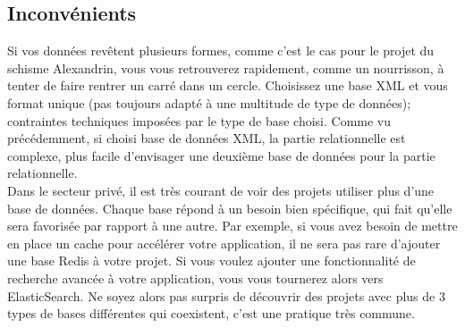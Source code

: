     \subsection{Inconvénients}

Si vos données revêtent plusieurs formes, comme c’est le cas pour le projet du schisme Alexandrin, vous vous retrouverez rapidement, comme un nourrisson, à tenter de faire rentrer un carré dans un cercle. Choisissez une base XML et vous 
format unique (pas toujours adapté à une multitude de type de données); contraintes techniques imposées par le type de base choisi. Comme vu précédemment, si choisi base de données XML, la partie relationnelle est complexe, plus facile d’envisager une deuxième base de données pour la partie relationnelle.\\ 
Dans le secteur privé, il est très courant de voir des projets utiliser plus d’une base de données. Chaque base répond à un besoin bien spécifique, qui fait qu’elle sera favorisée par rapport à une autre. Par exemple, si vous avez besoin de mettre en place un cache pour accélérer votre application, il ne sera pas rare d’ajouter une base Redis à votre projet. Si vous voulez ajouter une fonctionnalité de recherche avancée à votre application, vous vous tournerez alors vers ElasticSearch. Ne soyez alors pas surpris de découvrir des projets avec plus de 3 types de bases différentes qui coexistent, c’est une pratique très commune. 
